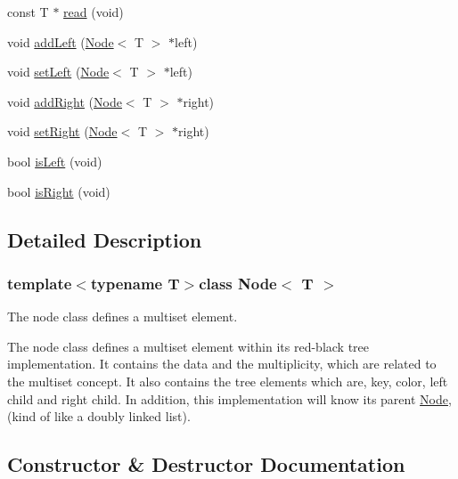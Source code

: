 \begin{DoxyCompactItemize}
const T $\ast$ \hyperlink{class_node_a565b1a8bbc88c67b5dbc6a78a11a4ba2}{read} (void)
\item 
void \hyperlink{class_node_a78c42d0d8acc20440279aa851c02b38e}{add\+Left} (\hyperlink{class_node}{Node}$<$ T $>$ $\ast$left)
\item 
void \hyperlink{class_node_a5d10f30efdc1d5af2f1e906cb30609c6}{set\+Left} (\hyperlink{class_node}{Node}$<$ T $>$ $\ast$left)
\item 
void \hyperlink{class_node_ae0a74454b02ab98b6c373dea65ac441e}{add\+Right} (\hyperlink{class_node}{Node}$<$ T $>$ $\ast$right)
\item 
void \hyperlink{class_node_a91c3e21d17faf184c2dc23340d62f197}{set\+Right} (\hyperlink{class_node}{Node}$<$ T $>$ $\ast$right)
\item 
bool \hyperlink{class_node_a614f99e8df6aebb91c9e17e204a8c170}{is\+Left} (void)
\item 
bool \hyperlink{class_node_ac8eeb9f7717618589d939491d87a04bf}{is\+Right} (void)
\end{DoxyCompactItemize}


\subsection{Detailed Description}
\subsubsection*{template$<$typename T$>$class Node$<$ T $>$}

The node class defines a multiset element.

The node class defines a multiset element within it\textquotesingle{}s red-\/black tree implementation. It contains the data and the multiplicity, which are related to the multiset concept. It also contains the tree elements which are, key, color, left child and right child. In addition, this implementation will know it\textquotesingle{}s parent \hyperlink{class_node}{Node}, (kind of like a doubly linked list). 

\subsection{Constructor \& Destructor Documentation}
\hypertarget{class_node_a40d6e9db35a69683afc2a960f96c1109}{}
